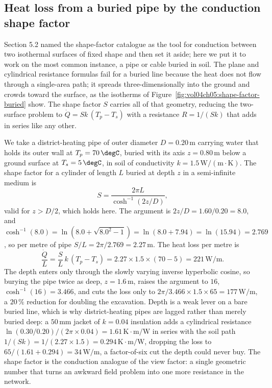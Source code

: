 

\subsection{Heat loss from a buried pipe by the conduction shape factor}

Section 5.2 named the shape-factor catalogue as the tool for conduction
between two isothermal surfaces of fixed shape and then set it aside; here
we put it to work on the most common instance, a pipe or cable buried in
soil. The plane and cylindrical resistance formulas fail for a buried line
because the heat does not flow through a single-area path; it spreads
three-dimensionally into the ground and crowds toward the surface, as the
isotherms of Figure~\ref{fig:vol04ch05:shape-factor-buried} show. The
shape factor $S$ carries all of that geometry, reducing the two-surface
problem to $\dot{Q} = S k\,(T_p - T_s)$ with a resistance $R = 1/(Sk)$
that adds in series like any other.



We take a district-heating pipe of outer diameter $D = 0.20\,\text{m}$
carrying water that holds its outer wall at $T_p = 70\,\degC$, buried with
its axis $z = 0.80\,\text{m}$ below a ground surface at $T_s = 5\,\degC$,
in soil of conductivity $k = 1.5\,\text{W}/(\text{m}\cdot\si{\kelvin})$.
The shape factor for a cylinder of length $L$ buried at depth $z$ in a
semi-infinite medium is
\[
S = \frac{2\pi L}{\cosh^{-1}(2z/D)},
\]
valid for $z > D/2$, which holds here. The argument is $2z/D = 1.60/0.20 =
8.0$, and $\cosh^{-1}(8.0) = \ln(8.0 + \sqrt{8.0^2 - 1}) = \ln(8.0 +
7.94) = \ln(15.94) = 2.769$, so per metre of pipe $S/L = 2\pi/2.769 =
2.27\,\text{m}$. The heat loss per metre is
\[
\frac{\dot{Q}}{L} = \frac{S}{L}\,k\,(T_p - T_s) = 2.27 \times 1.5 \times
(70 - 5) = 221\,\text{W}/\text{m}.
\]
The depth enters only through the slowly varying inverse hyperbolic cosine,
so burying the pipe twice as deep, $z = 1.6\,\text{m}$, raises the argument
to $16$, $\cosh^{-1}(16) = 3.466$, and cuts the loss only to $2\pi/3.466
\times 1.5 \times 65 = 177\,\text{W}/\text{m}$, a $20\,\%$ reduction for
doubling the excavation. Depth is a weak lever on a bare buried line,
which is why district-heating pipes are lagged rather than merely buried
deep: a $50\,\si{\milli\meter}$ jacket of $k = 0.04$ insulation adds a
cylindrical resistance $\ln(0.30/0.20)/(2\pi\times0.04) = 1.61\,\si{
\kelvin}\cdot\text{m}/\text{W}$ in series with the soil path
$1/(Sk) = 1/(2.27\times1.5) = 0.294\,\si{\kelvin}\cdot\text{m}/\text{W}$,
dropping the loss to $65/(1.61 + 0.294) = 34\,\text{W}/\text{m}$, a
factor-of-six cut the depth could never buy. The shape factor is the
conduction analogue of the view factor: a single geometric number that
turns an awkward field problem into one more resistance in the network.

